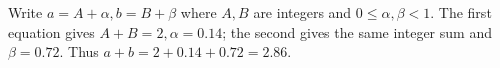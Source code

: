 Write $a=A+\alpha,b=B+\beta$ where $A,B$ are integers and $0\le\alpha,\beta<1$. The first equation gives $A+B=2,\alpha=0.14$; the second gives the same integer sum and $\beta=0.72$. Thus $a+b=2+0.14+0.72=\boxed{2.86}$.
